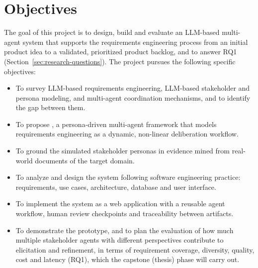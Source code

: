 \section{Objectives}
\label{sec:objectives}

The goal of this project is to design, build and evaluate an LLM-based multi-agent system that supports the requirements engineering process from an initial product idea to a validated, prioritized product backlog, and to answer RQ1 (Section~\ref{sec:research-questions}). The project pursues the following specific objectives:
\begin{itemize}
    \item To survey LLM-based requirements engineering, LLM-based stakeholder and persona modeling, and multi-agent coordination mechanisms, and to identify the gap between them.
    \item To propose \sysname{}, a persona-driven multi-agent framework that models requirements engineering as a dynamic, non-linear deliberation workflow.
    \item To ground the simulated stakeholder personas in evidence mined from real-world documents of the target domain.
    \item To analyze and design the system following software engineering practice: requirements, use cases, architecture, database and user interface.
    \item To implement the system as a web application with a reusable agent workflow, human review checkpoints and traceability between artifacts.
    \item To demonstrate the prototype, and to plan the evaluation of how much multiple stakeholder agents with different perspectives contribute to elicitation and refinement, in terms of requirement coverage, diversity, quality, cost and latency (RQ1), which the capstone (thesis) phase will carry out.
\end{itemize}
